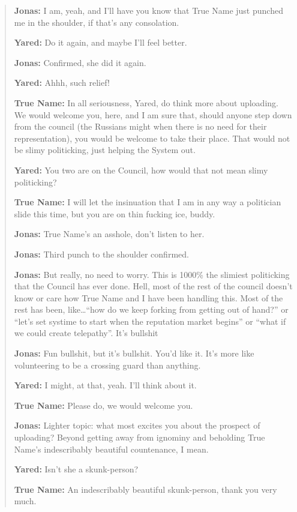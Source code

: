 \begin{quote}
\textbf{Jonas:} I am, yeah, and I'll have you know that True Name just punched me in the shoulder, if that's any consolation.

\textbf{Yared:} Do it again, and maybe I'll feel better.

\textbf{Jonas:} Confirmed, she did it again.

\textbf{Yared:} Ahhh, such relief!

\textbf{True Name:} In all seriousness, Yared, do think more about uploading. We would welcome you, here, and I am sure that, should anyone step down from the council (the Russians might when there is no need for their representation), you would be welcome to take their place. That would not be slimy politicking, just helping the System out.

\textbf{Yared:} You two are on the Council, how would that not mean slimy politicking?

\textbf{True Name:} I will let the insinuation that I am in any way a politician slide this time, but you are on thin fucking ice, buddy.

\textbf{Jonas:} True Name's an asshole, don't listen to her.

\textbf{Jonas:} Third punch to the shoulder confirmed.

\textbf{Jonas:} But really, no need to worry. This is 1000\% the slimiest politicking that the Council has ever done. Hell, most of the rest of the council doesn't know or care how True Name and I have been handling this. Most of the rest has been, like\ldots{}``how do we keep forking from getting out of hand?'' or ``let's set systime to start when the reputation market begins'' or ``what if we could create telepathy''. It's bullshit

\textbf{Jonas:} Fun bullshit, but it's bullshit. You'd like it. It's more like volunteering to be a crossing guard than anything.

\textbf{Yared:} I might, at that, yeah. I'll think about it.

\textbf{True Name:} Please do, we would welcome you.

\textbf{Jonas:} Lighter topic: what most excites you about the prospect of uploading? Beyond getting away from ignominy and beholding True Name's indescribably beautiful countenance, I mean.

\textbf{Yared:} Isn't she a skunk-person?

\textbf{True Name:} An indescribably beautiful skunk-person, thank you very much.


\end{quote}
